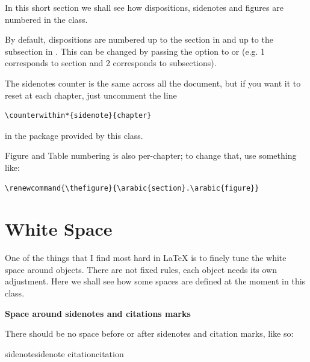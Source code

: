In this short section we shall see how dispositions, sidenotes and 
figures are numbered in the  class.

By default, dispositions are numbered up to the section in 
and up to the subsection in . This can be changed by
passing the option  to or
 (e.g. 1 corresponds to section and 2 corresponds to
subsections).

The sidenotes counter is the same across all the document, but if you 
want it to reset at each chapter, just uncomment the line

\begin{lstlisting}[style=kaolstplain]
\counterwithin*{sidenote}{chapter}
\end{lstlisting}

in the  package provided by this class.

Figure and Table numbering is also per-chapter; to change that, use 
something like:

\begin{lstlisting}[style=kaolstplain]
\renewcommand{\thefigure}{\arabic{section}.\arabic{figure}}
\end{lstlisting}

\section{White Space}

One of the things that I find most hard in \LaTeX\xspace is to finely 
tune the white space around objects. There are not fixed rules, each 
object needs its own adjustment. Here we shall see how some spaces are 
defined at the moment in this class.

\textbf{Space around sidenotes and citations marks}

There should be no space before or after sidenotes and citation marks, 
like so:

sidenotesidenote\newline
citation\cite{James2013}citation

